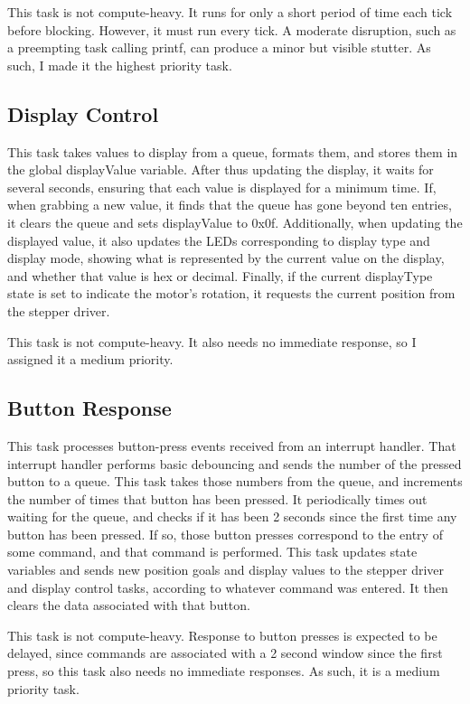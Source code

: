 \documentclass[12pt]{amsart}
\begin{document}
This task is not compute-heavy. It runs for only a short period of time each tick before blocking.
However, it must run every tick. A moderate disruption, such as a preempting task calling printf, can
produce a minor but visible stutter. As such, I made it the highest priority task.

\subsection{Display Control}

This task takes values to display from a queue, formats them, and stores them in the global displayValue
variable. After thus updating the display, it waits for several seconds, ensuring that each value
is displayed for a minimum time. If, when grabbing a new value, it finds that the queue has gone
beyond ten entries, it clears the queue and sets displayValue to 0x0f. Additionally, when updating
the displayed value, it also updates the LEDs corresponding to display type and display mode,
showing what is represented by the current value on the display, and whether that value is hex or
decimal. Finally, if the current displayType state is set to indicate the motor's rotation, it
requests the current position from the stepper driver.

This task is not compute-heavy. It also needs no immediate response, so I assigned it a medium
priority.

\subsection{Button Response}

This task processes button-press events received from an interrupt handler. That interrupt handler
performs basic debouncing and sends the number of the pressed button to a queue. This task takes
those numbers from the queue, and increments the number of times that button has been pressed. It
periodically times out waiting for the queue, and checks if it has been 2 seconds since the first time
any button has been pressed. If so, those button presses correspond to the entry of some command,
and that command is performed. This task updates state variables and sends new position goals and
display values to the stepper driver and display control tasks, according to whatever command was
entered. It then clears the data associated with that button.

This task is not compute-heavy. Response to button presses is expected to be delayed, since commands
are associated with a 2 second window since the first press, so this task also needs no immediate
responses. As such, it is a medium priority task.
\end{document}
